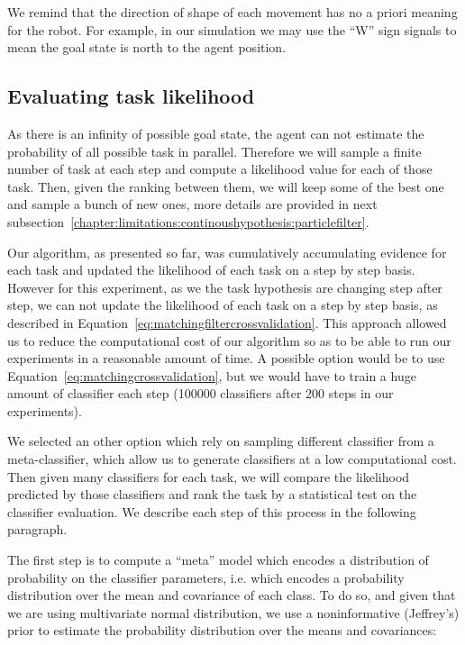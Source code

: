 We remind that the direction of shape of each movement has no a priori meaning for the robot. For example, in our simulation we may use the ``W'' sign signals to mean the goal state is north to the agent position.


\subsection{Evaluating task likelihood}

As there is an infinity of possible goal state, the agent can not estimate the probability of all possible task in parallel. Therefore we will sample a finite number of task at each step and compute a likelihood value for each of those task. Then, given the ranking between them, we will keep some of the best one and sample a bunch of new ones, more details are provided in next subsection~\ref{chapter:limitations:continoushypothesis:particlefilter}.

Our algorithm, as presented so far, was cumulatively accumulating evidence for each task and updated the likelihood of each task on a step by step basis. However for this experiment, as we the task hypothesis are changing step after step, we can not update the likelihood of each task on a step by step basis, as described in Equation~\ref{eq:matchingfiltercrossvalidation}. This approach allowed us to reduce the computational cost of our algorithm so as to be able to run our experiments in a reasonable amount of time. A possible option would be to use Equation~\ref{eq:matchingcrossvalidation}, but we would have to train a huge amount of classifier each step (100000 classifiers after 200 steps in our experiments).

We selected an other option which rely on sampling different classifier from a meta-classifier, which allow us to generate classifiers at a low computational cost. Then given many classifiers for each task, we will compare the likelihood predicted by those classifiers and rank the task by a statistical test on the classifier evaluation. We describe each step of this process in the following paragraph.

The first step is to compute a ``meta'' model which encodes a distribution of probability on the classifier parameters, i.e. which encodes a probability distribution over the mean and covariance of each class. To do so, and given that we are using multivariate normal distribution, we use a noninformative (Jeffrey's) prior \cite{gelman2003bayesian} to estimate the probability distribution over the means and covariances:

